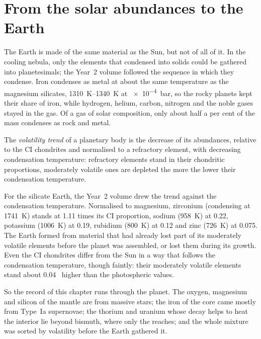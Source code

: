 \section{From the solar abundances to the Earth}\label{sec:b3:origin-of-elements:earth}

The Earth is made of the same material as the Sun, but not of all of
it. In the cooling nebula, only the elements that condensed into solids
could be gathered into planetesimals; the Year~2 volume followed the
sequence in which they condense. Iron condenses as metal at about the
same temperature as the magnesium silicates, \qtyrange{1310}{1340}{K} at
\qty{e-4}{bar}, so the rocky planets kept their share of iron, while
hydrogen, helium, carbon, nitrogen and the noble gases stayed in the gas.
Of a gas of solar composition, only about half a per cent of the mass
condenses as rock and metal.

\begin{definition}\label{def:b3:origin-of-elements:volatility}
The \emph{volatility trend} of a planetary body
is the decrease of its abundances, relative to the CI chondrites and
normalised to a refractory element, with decreasing condensation
temperature: refractory elements stand in their chondritic proportions,
moderately volatile ones are depleted the more the lower their
condensation temperature.
\end{definition}

For the silicate Earth, the Year~2 volume drew the trend against the
condensation temperature. Normalised to magnesium, zirconium
(condensing at \qty{1741}{K}) stands at \num{1.11} times its CI
proportion, sodium (\qty{958}{K}) at \num{0.22}, potassium
(\qty{1006}{K}) at \num{0.19}, rubidium (\qty{800}{K}) at \num{0.12}
and zinc (\qty{726}{K}) at \num{0.075}. The Earth formed from material
that had already lost part of its moderately volatile elements before
the planet was assembled, or lost them during its growth. Even the CI
chondrites differ from the Sun in a way that follows the condensation
temperature, though faintly: their moderately volatile elements stand
about \num{0.04}~ higher than the photospheric values.

So the record of this chapter runs through the planet. The oxygen,
magnesium and silicon of the mantle are  from massive
stars; the iron of the core came mostly from Type~Ia supernovae; the
thorium and uranium whose decay helps to heat the interior lie beyond
bismuth, where only the  reaches; and the whole mixture was
sorted by volatility before the Earth gathered it.

